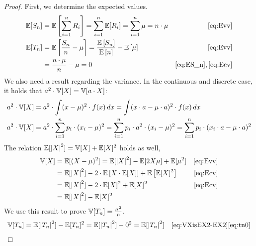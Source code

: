 \begin{proof}
  First, we determine the expected values.
  \begin{align}
      \mathbb E[S_n] &= \mathbb E\left[\sum_{i=1}^n R_i\right] = \sum_{i=1}^n \mathbb E[R_i] = \sum_{i=1}^n \mu = n \cdot \mu & \eqref{eq:Evv} \label{eq:ES_n} \\
      \mathbb E[T_n] &= \mathbb E\left[\frac{S_n}{n} - \mu\right] = \frac{\mathbb E\left[S_n\right]}{\mathbb E\left[n\right]} - \mathbb E\left[\mu\right] & \eqref{eq:Evv} \notag\\
              &= \frac{n \cdot \mu}{n} - \mu = 0  & \eqref{eq:ES_n}, \eqref{eq:Ecv} \label{eq:tn0}
  \end{align}
  We also need a result regarding the variance.
  In the continuous and discrete case, it holds that $a^2 \cdot \mathbb V[X] = \mathbb V[a \cdot X]$:
  \begin{align}
    a^2 \cdot \mathbb V[X] &= a^2 \cdot \int (x - \mu)^2 \cdot f(x) \, dx = \int (x \cdot a - \mu \cdot a)^2 \cdot f(x) \, dx \notag \\
    a^2 \cdot \mathbb V[X] &= a^2 \cdot \sum_{i=1}^n p_i \cdot (x_i - \mu)^2 = \sum_{i=1}^n p_i \cdot a^2 \cdot (x_i - \mu)^2 = \sum_{i=1}^n p_i \cdot (x_i \cdot a - \mu \cdot a)^2 \label{eq:a2V}
  \end{align}
  The relation $\mathbb E[\left\lvert{X}\right\rvert^2] = \mathbb V[X] + \mathbb E[X]^2$ holds as well,
  \begin{align}
    \mathbb V[X] &= \mathbb E[(X - \mu)^2] = \mathbb E[\left\lvert{X}\right\rvert^2] - \mathbb E[2X\mu] + \mathbb E[\mu^2] \notag & \eqref{eq:Evv} \\
            &= \mathbb E[\left\lvert{X}\right\rvert^2] - 2 \cdot \mathbb E\left[X \cdot \mathbb E[X]\right] + \mathbb E\left[\mathbb E[X]^2\right] & \eqref{eq:Ecv} \notag\\
            &= \mathbb E[\left\lvert{X}\right\rvert^2] - 2 \cdot \mathbb E[X]^2 + \mathbb E[X]^2 & \eqref{eq:Ecv} \notag\\
            &= \mathbb E[\left\lvert{X}\right\rvert^2] - \mathbb E[X]^2 \label{eq:VXisEX2-EX2}
  \end{align}
  We use this result to prove $\mathbb V[T_n] = \frac{\sigma^2}{n}$.
  \begin{align}
    \Var[T_n] &= \E[\norm{T_n}^2] - \E[T_n]^2 = \E[\norm{T_n}^2] - 0^2 = \E[\norm{T_n}^2] & \eqref{eq:VXisEX2-EX2} \eqref{eq:tn0} \notag\\

\end{align}
\end{proof}
